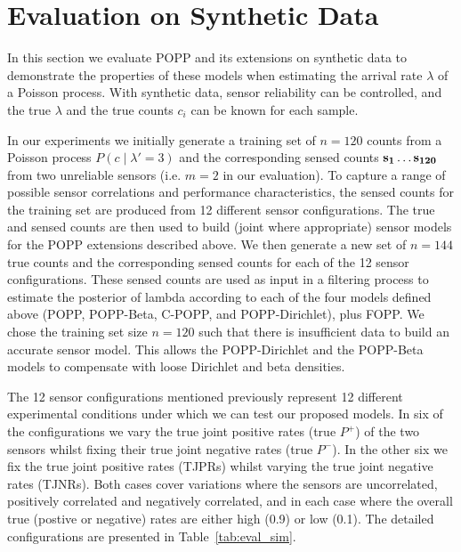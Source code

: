 
\section{Evaluation on Synthetic Data}
\label{sec:evasim}

In this section we evaluate POPP and its extensions on synthetic data to demonstrate the properties of these models when estimating the arrival rate $\lambda$ of a Poisson process. With synthetic data, sensor reliability can be controlled, and the true $\lambda$ and the true counts $c_i$ can be known for each sample.


In our experiments we initially generate a training set of $n=120$ counts from a Poisson process $P(c \mid \lambda'=3)$ and the corresponding sensed counts $\protect\mathbf{s_1} \ldots \protect\mathbf{s_{120}}$ from two unreliable sensors (i.e. $m=2$ in our evaluation). To capture a range of possible sensor correlations and performance characteristics, the sensed counts for the training set are produced from 12 different sensor configurations. The true and sensed counts are then used to build (joint where appropriate) sensor models for the POPP extensions described above. We then generate a new set of $n=144$ true counts and the corresponding sensed counts for each of the 12 sensor configurations. These sensed counts are used as input in a filtering process to estimate the posterior of lambda according to each of the four models defined above (POPP, POPP-Beta, C-POPP, and POPP-Dirichlet), plus FOPP.
% 
We chose the training set size $n=120$ such that there is insufficient data to build an accurate sensor model. This allows the POPP-Dirichlet and the POPP-Beta models to compensate with loose Dirichlet and beta densities. 

The 12 sensor configurations mentioned previously represent 12 different experimental conditions under which we can test our proposed models. In six of the configurations we vary the true joint positive rates (true $P^+$) of the two sensors whilst fixing their true joint negative rates (true $P^-$). In the other six we fix the true joint positive rates (TJPRs) whilst varying the true joint negative rates (TJNRs). Both cases cover variations where the sensors are uncorrelated, positively correlated and negatively correlated, and in each case where the overall true (postive or negative) rates are either high (0.9) or low (0.1). The detailed configurations are presented in Table~\ref{tab:eval_sim}. 



